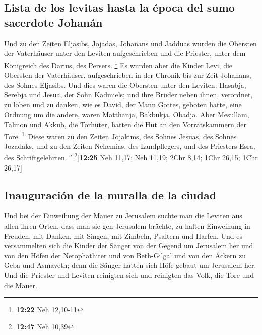 \hypertarget{lista-de-los-levitas-hasta-la-uxe9poca-del-sumo-sacerdote-johanuxe1n}{%
\subsection{Lista de los levitas hasta la época del sumo sacerdote
Johanán}\label{lista-de-los-levitas-hasta-la-uxe9poca-del-sumo-sacerdote-johanuxe1n}}

 Und zu den Zeiten Eljasibs, Jojadas, Johanans und
Jadduas wurden die Obersten der Vaterhäuser unter den Leviten
aufgeschrieben und die Priester, unter dem Königreich des Darius, des
Persers. \footnote{\textbf{12:22} Neh 12,10-11}  Es
wurden aber die Kinder Levi, die Obersten der Vaterhäuser,
aufgeschrieben in der Chronik bis zur Zeit Johanans, des Sohnes
Eljasibs.  Und dies waren die Obersten unter den Leviten:
Hasabja, Serebja und Jesua, der Sohn Kadmiels; und ihre Brüder neben
ihnen, verordnet, zu loben und zu danken, wie es David, der Mann Gottes,
geboten hatte, eine Ordnung um die andere,  waren
Matthanja, Bakbukja, Obadja. Aber Mesullam, Talmon und Akkub, die
Torhüter, hatten die Hut an den Vorratskammern der Tore.
\textsuperscript{b}  Diese waren zu den Zeiten Jojakims,
des Sohnes Jesuas, des Sohnes Jozadaks, und zu den Zeiten Nehemias, des
Landpflegers, und des Priesters Esra, des Schriftgelehrten.
\textsuperscript{c} \footnote{\textbf{12:47} Neh 10,39}{[}\textbf{12:25}
Neh 11,17; Neh 11,19; 2Chr 8,14; 1Chr 26,15; 1Chr 26,17{]}

\hypertarget{inauguraciuxf3n-de-la-muralla-de-la-ciudad}{%
\subsection{Inauguración de la muralla de la
ciudad}\label{inauguraciuxf3n-de-la-muralla-de-la-ciudad}}

 Und bei der Einweihung der Mauer zu Jerusalem suchte man
die Leviten aus allen ihren Orten, dass man sie gen Jerusalem brächte,
zu halten Einweihung in Freuden, mit Danken, mit Singen, mit Zimbeln,
Psaltern und Harfen.  Und es versammelten sich die Kinder
der Sänger von der Gegend um Jerusalem her und von den Höfen der
Netophathiter  und von Beth-Gilgal und von den Äckern zu
Geba und Asmaveth; denn die Sänger hatten sich Höfe gebaut um Jerusalem
her.  Und die Priester und Leviten reinigten sich und
reinigten das Volk, die Tore und die Mauer.

